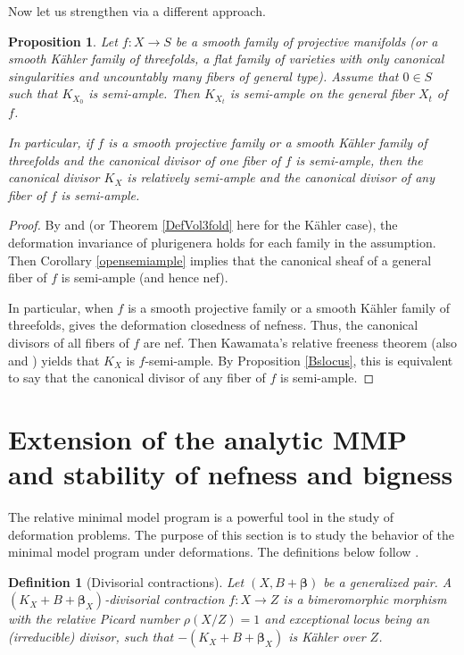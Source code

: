 \documentclass[12pt]{amsart}
\numberwithin{equation}{section}
\newtheorem{proposition}[theorem]{Proposition}
\theoremstyle{definition}
\theoremstyle{plain}
\newtheorem{definition}  [theorem]     {Definition}
\newtheorem*{thm A*}{Theorem A}
\newtheorem*{thm B*}{Theorem B}
\newtheorem*{thm C*}{Theorem C}
\newtheorem*{thm D*}{Theorem D}
\theoremstyle{definition}
\renewcommand{\1}{\mathds{1}}
\renewcommand{\>}{\rightarrow}
\begin{document}
Now let us strengthen \cite[Corollaries 1.2, 1.12]{LRW25} via a different approach. 
\begin{proposition}\label{defsemiample}
Let $f:X\to S$ be a smooth family of projective manifolds (or a smooth K\"ahler family of threefolds, a flat family of varieties with only canonical singularities and uncountably many fibers of general type). Assume that $0\in S$ such that $K_{X_{0}}$ is semi-ample. Then $K_{X_t}$ is semi-ample on the
 general fiber $X_t$ of $f$. 

In particular, if $f$ is a smooth projective family or a smooth K\"ahler family of threefolds and the canonical divisor of one fiber of $f$ is semi-ample, then the canonical divisor $K_X$ is relatively semi-ample and the canonical divisor of any fiber of $f$ is semi-ample. 
\end{proposition}
\begin{proof}
By \cite[Theorem 1.2]{RT2} and \cite[Corollary 1.12]{LRW25} (or Theorem \ref{DefVol3fold} here for the K\"ahler case), the deformation invariance of plurigenera holds for each family in the assumption. Then Corollary \ref{opensemiample} implies that the canonical sheaf of a general fiber of $f$ is semi-ample (and hence nef).

In particular, when $f$ is a smooth projective family or a smooth K\"ahler family of threefolds, \cite[Theorems 1.1, 1.10]{LRW25} gives the deformation closedness of nefness. Thus, the canonical divisors of all fibers of $f$ are nef. Then Kawamata's relative freeness theorem \cite{Kawa85} (also \cite[Theorem 5.8]{Naka85} and \cite[Theorem 1]{FujinoKawa}) yields that $K_X$ is $f$-semi-ample. By Proposition \ref{Bslocus}, this is equivalent to say that the canonical divisor of any fiber of $f$ is semi-ample.  
\end{proof}




\section{Extension of the analytic MMP and stability of nefness and bigness}\label{Section: ExtMMP}
The relative minimal model program is a powerful tool in the study of deformation problems. The purpose of this section is to study the behavior of the minimal model program under deformations. The definitions below follow \cite{DHY23}. 
\begin{definition}[Divisorial contractions]\label{DefinitionDivisorial}
Let $(X,B+\boldsymbol{\beta})$ be a generalized pair.
A $(K_X+B+\boldsymbol{\beta}_X)$-\emph{divisorial contraction} $f:X\to Z$ is a bimeromorphic morphism with the relative Picard number $\rho(X/Z) = 1$ and exceptional locus being an (irreducible) divisor, such that $-(K_X+B+ \boldsymbol{\beta}_X)$ is K\"ahler over $Z$.
\end{definition}
\end{document}
